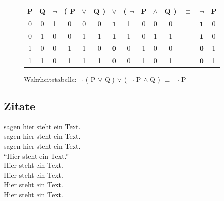\begin{figure}[!ht]
    \begin{center}
        \begin{tabular}{|c|c||c|c|c|c|c|c|c|c|c||c||c|c|}
            \hline
            P & Q & $\neg$ & ( P & $\vee$ & Q ) & $\vee$       & ( $\neg$ & P & $\wedge$ & Q ) & $\equiv$ & $\neg$       & P \\ \hline \hline
            0 & 0 & 1      & 0   & 0      & 0   & $\mathbf{1}$ & 1        & 0 & 0        & 0   &          & $\mathbf{1}$ & 0 \\ \hline
            0 & 1 & 0      & 0   & 1      & 1   & $\mathbf{1}$ & 1        & 0 & 1        & 1   &          & $\mathbf{1}$ & 0 \\ \hline
            1 & 0 & 0      & 1   & 1      & 0   & $\mathbf{0}$ & 0        & 1 & 0        & 0   &          & $\mathbf{0}$ & 1 \\ \hline
            1 & 1 & 0      & 1   & 1      & 1   & $\mathbf{0}$ & 0        & 1 & 0        & 1   &          & $\mathbf{0}$ & 1 \\ \hline
        \end{tabular}
        \caption{Wahrheitstabelle: $\neg$ ( P $\vee$ Q ) $\vee$ ( $\neg$ P $\wedge$ Q ) $\equiv$ $\neg$ P}
    \end{center}
\end{figure}

\subsection{Zitate}\label{subsec:zitate}
\cite{BarAhl08} sagen hier steht ein Text. \\
\textcite{BruMurPerWygMcN09} sagen hier steht ein Text. \\
\textcite*{BruMurPerWygMcN09} sagen hier steht ein Text. \\
"`Hier steht ein Text."' \autocite{BarAhl08} \\
Hier steht ein Text. \autocite[Vgl.][]{BarAhl08} \\
Hier steht ein Text. \autocite[][S. 200]{BruMurPerWygMcN09} \\
Hier steht ein Text. \autocite*[][S. 200]{BruMurPerWygMcN09} \\
Hier steht ein Text. \autocite{wiki:001,BruMurPerWygMcN09} \\

